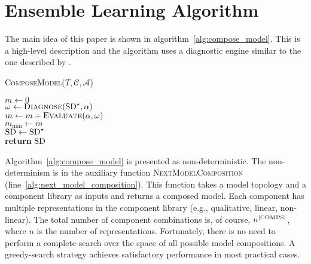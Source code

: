 \section{Ensemble Learning Algorithm}
%
The main idea of this paper is shown in
algorithm~\ref{alg:compose_model}. This is a high-level description
and the algorithm uses a diagnostic engine similar to the one
described by \cite{feldman13genius}.
%
\begin{algorithm}[htb]
\begin{footnotesize}
%
\caption{\textsc{ComposeModel}($T, \mathcal{C}, \mathcal{A}$)}
\label{alg:compose_model}
%
%
%
\vspace{0.075in}
%
{
    $m \gets 0$\\
    {
        $\omega \gets \textsc{Diagnose}(\mathrm{SD}^\star, \alpha)$\\
        $m \gets m + \textsc{Evaluate}(\alpha, \omega)$\\
    }
    {
        $m_{\min} \gets m$\\
        $\mathrm{SD} \gets \mathrm{SD}^\star$\\
    }
}
\textbf{return} $\mathrm{SD}$
%
\end{footnotesize}
\end{algorithm}
%
\par
%
Algorithm~\ref{alg:compose_model} is presented as
non-deterministic. The non-determinism is in the auxiliary function
\textsc{NextModelComposition}
(line~\ref{alg:next_model_composition}). This function takes a model
topology and a component library as inputs and returns a composed
model. Each component has multiple representations in the component
library (e.g., qualitative, linear, non-linear). The total number of
component combinations is, of course, $n^{|\mathrm{COMPS}|}$, where $n$ is the
number of representations. Fortunately, there is no need to perform a
complete-search over the space of all possible model compositions. A
greedy-search strategy achieves satisfactory performance in most
practical cases.
